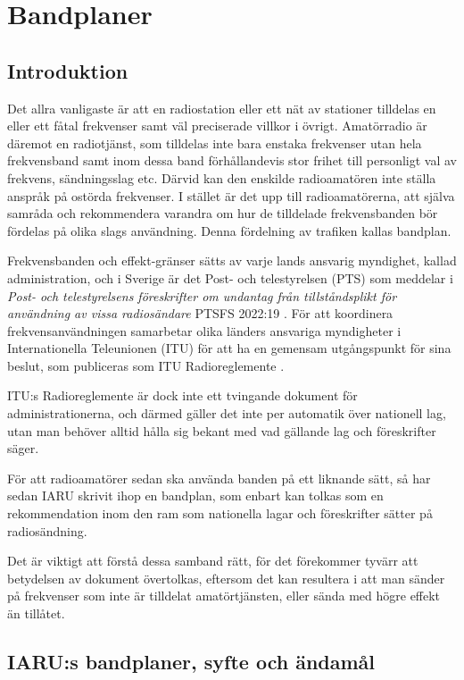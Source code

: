 \section{Bandplaner}
\label{bandplaner}

\subsection{Introduktion}

Det allra vanligaste är att en radiostation eller ett nät av stationer tilldelas
en eller ett fåtal frekvenser samt väl preciserade villkor i övrigt.
Amatörradio är däremot en radiotjänst, som tilldelas inte bara enstaka
frekvenser utan hela frekvensband samt inom dessa band förhållandevis stor
frihet till personligt val av frekvens, sändningsslag etc.
Därvid kan den enskilde radioamatören inte ställa anspråk på ostörda frekvenser.
I stället är det upp till radioamatörerna, att själva samråda och rekommendera
varandra om hur de tilldelade frekvensbanden bör fördelas på olika slags
användning.
Denna fördelning av trafiken kallas bandplan.

Frekvensbanden och effekt-gränser sätts av varje lands ansvarig myndighet,
kallad administration, och i Sverige är det Post- och telestyrelsen (PTS) som
meddelar i \emph{Post- och telestyrelsens föreskrifter om undantag från
tillståndsplikt för användning av vissa radiosändare} PTSFS 2022:19
\cite{PTSFS2022:19}.
För att koordinera frekvensanvändningen samarbetar olika länders ansvariga
myndigheter i Internationella Teleunionen (ITU) för att ha en gemensam
utgångspunkt för sina beslut, som publiceras som
ITU Radioreglemente \cite{ITU-RR}.

ITU:s Radioreglemente är dock inte ett tvingande dokument för
administrationerna, och därmed gäller det inte per automatik över
nationell lag, utan man behöver alltid hålla sig bekant med vad gällande lag
och föreskrifter säger.

För att radioamatörer sedan ska använda banden på ett liknande sätt, så har
sedan IARU skrivit ihop en bandplan, som enbart kan tolkas som en rekommendation
inom den ram som nationella lagar och föreskrifter sätter på radiosändning.

Det är viktigt att förstå dessa samband rätt, för det förekommer tyvärr att
betydelsen av dokument övertolkas, eftersom det kan resultera i att man sänder
på frekvenser som inte är tilldelat amatörtjänsten, eller sända med högre
effekt än tillåtet.

\subsection{IARU:s bandplaner, syfte och ändamål}

